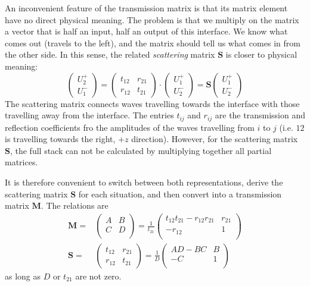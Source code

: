 An inconvenient feature of the transmission matrix is that its matrix element have no direct physical meaning. The problem is that we multiply on the matrix a vector that is half an input, half an output of this interface. We know what comes out (travels to the left), and the matrix should tell us what comes in from the other side. In this sense, the related \emph{scattering} matrix $\mathbf{S}$ is closer to physical meaning:
\begin{equation}
\begin{pmatrix}
U_2^+ \\ U_1^-
\end{pmatrix}
= 
\begin{pmatrix}
t_{12} & r_{21}  \\ r_{12} & t_{21}
\end{pmatrix}
\cdot
\begin{pmatrix}
U_1^+ \\ U_2^-
\end{pmatrix}
%
= \mathbf{S}
\begin{pmatrix}
U_1^+ \\ U_2^-
\end{pmatrix}
\end{equation}
The scattering matrix connects waves travelling towards the interface with those travelling away from the interface. The entries $t_{ij}$ and $r_{ij}$ are the transmission and reflection coefficients fro the amplitudes of the waves travelling from $i$ to $j$ (i.e. $12$ is travelling towards the right, $+z$ direction). However, for the scattering matrix $\mathbf{S}$, the full stack can not be calculated by multiplying together all partial matrices.

It is therefore convenient to switch between both representations, derive the scattering matrix $\mathbf{S}$ for each situation, and then convert into a transmission matrix $\mathbf{M}$. The relations are
\begin{align}
\mathbf{M} =  &
\begin{pmatrix}
A & B \\ C & D \\
\end{pmatrix}
=
\frac{1}{t_{21}}
\begin{pmatrix}
t_{12} t_{21} - r_{12}r_{21} & r_{21} \\ - r_{12} & 1 \\
\end{pmatrix} \label{eq:M_from_S}
\\
\mathbf{S} =  &
\begin{pmatrix}
t_{12} & r_{21}  \\ r_{12} & t_{21}
\end{pmatrix}
=
\frac{1}{D}
\begin{pmatrix}
AD - BC & B \\ -C & 1 \\
\end{pmatrix} \label{eq:S_from_M}
\end{align}
as long as $D$ or $t_{21}$ are not zero.


